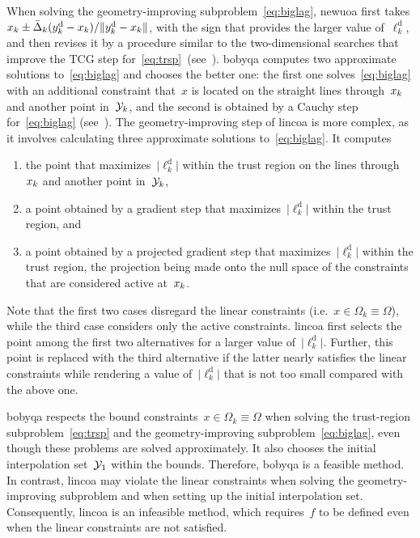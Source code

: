 \documentclass[
    smallextended,  %
    final,          %
]{svjour3}
\newcommand{\abs}[2][]{#1\lvert#2#1\rvert}
\newcommand{\drop}{{\text{d}}}
\newcommand{\fsetm}[1][k]{\Omega_{#1}}
\newcommand{\fset}{\Omega}
\newcommand{\iter}[1][k]{x\ifthenelse{\equal{#1}{}}{}{_{#1}}}
\newcommand{\obj}{f}
\newcommand{\radalt}[1][k]{\bar{\Delta}\ifthenelse{\equal{#1}{}}{}{_{#1}}}
\newcommand{\xpt}[1][k]{\mathcal{Y}\ifthenelse{\equal{#1}{}}{}{_{#1}}}
\begin{document}
When solving the geometry-improving subproblem~\eqref{eq:biglag},
\gls{newuoa} first takes $\iter \pm \radalt (y_k^\drop - \iter)/\|y_k^\drop -\iter\|$,
with the sign that provides the larger value of~$\ell_k^\drop$, and then revises it by
a procedure similar to the two-dimensional searches that improve the TCG step for~\eqref{eq:trsp}~(see~\cite[\S~6]{Powell_2006}).
\gls{bobyqa} computes two approximate solutions to~\eqref{eq:biglag} and chooses the better one:
the first one solves~\eqref{eq:biglag} with an additional constraint that~$x$ is located on the
straight lines through~$\iter$ and another point in~$\xpt$, and the second is obtained by a Cauchy
step for~\eqref{eq:biglag} (see~\cite[\S~3]{Powell_2009}).
The geometry-improving step of \gls{lincoa} is more complex, as it involves calculating three
approximate solutions to~\eqref{eq:biglag}.
It computes
\begin{enumerate}
    \item the point that maximizes~$\abs{\ell_k^{\drop}}$ within the trust region on the lines
        through~$\iter$ and another point in~$\xpt$,
    \item a point obtained by a gradient step that maximizes~$\abs{\ell_k^{\drop}}$ within the trust region, and
    \item a point obtained by a projected gradient step that maximizes~$\abs{\ell_k^{\drop}}$ within the trust region, the projection being made onto the null space of the constraints that are considered active at~$\iter$.
\end{enumerate}
Note that the first two cases disregard the linear constraints (i.e.~$x\in\fsetm \equiv
\fset$), while the third case
considers only the active constraints.
\gls{lincoa} first selects the point among the first two alternatives for a larger value of~$\abs{\ell_k^{\drop}}$.
Further, this point is replaced with the third alternative if the latter nearly satisfies the linear
constraints while rendering a value of~$\abs{\ell_k^{\drop}}$ that is not too small compared with the above one.

\gls{bobyqa} respects the bound constraints~$x\in\fsetm \equiv \fset$ when
solving the trust-region subproblem~\eqref{eq:trsp} and the geometry-improving subproblem~\eqref{eq:biglag},
even though these problems are solved approximately. It also chooses the initial interpolation
set~$\xpt[1]$ within the bounds. Therefore, \gls{bobyqa} is a feasible method.
In contrast, \gls{lincoa} may violate the linear constraints when solving the geometry-improving
subproblem and when setting up the initial interpolation set. Consequently, \gls{lincoa} is
an infeasible method, which requires~$\obj$ to be defined even when the linear constraints are not satisfied.
\end{document}
